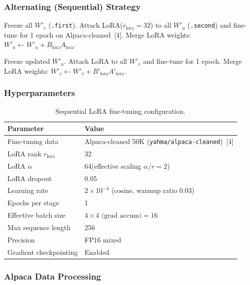 \documentclass[11pt,a4paper]{article}
\theoremstyle{remark}
\begin{document}
\subsubsection*{Alternating (Sequential) Strategy}

\begin{description}[leftmargin=2em]
  \item[Stage 1 --- $\mathrm{LoRA}_u$:]
    Freeze all $W'_v$ (\texttt{.first}).
    Attach LoRA($r_{\text{lora}}{=}32$) to all $W'_u$ (\texttt{.second})
    and fine-tune for 1 epoch on Alpaca-cleaned~[4].
    Merge LoRA weights: $W'_u \gets W'_u + B_\text{lora} A_\text{lora}$.

  \item[Stage 2 --- $\mathrm{LoRA}_v$:]
    Freeze updated $W'_u$.
    Attach LoRA to all $W'_v$ and fine-tune for 1 epoch.
    Merge LoRA weights: $W'_v \gets W'_v + B'_\text{lora} A'_\text{lora}$.
\end{description}

\subsubsection*{Hyperparameters}

\begin{table}[H]
\centering
\caption{Sequential LoRA fine-tuning configuration.}
\begin{tabular}{@{}ll@{}}
\toprule
\textbf{Parameter} & \textbf{Value} \\
\midrule
Fine-tuning data & Alpaca-cleaned 50K (\texttt{yahma/alpaca-cleaned})~[4] \\
LoRA rank $r_{\text{lora}}$ & 32 \\
LoRA $\alpha$ & 64\quad (effective scaling $\alpha/r = 2$) \\
LoRA dropout & 0.05 \\
Learning rate & $2\times10^{-4}$ (cosine, warmup ratio 0.03) \\
Epochs per stage & 1 \\
Effective batch size & $4 \times 4\text{ (grad accum)} = 16$ \\
Max sequence length & 256 \\
Precision & FP16 mixed \\
Gradient checkpointing & Enabled \\
\bottomrule
\end{tabular}
\end{table}

\subsubsection*{Alpaca Data Processing}
\end{document}

